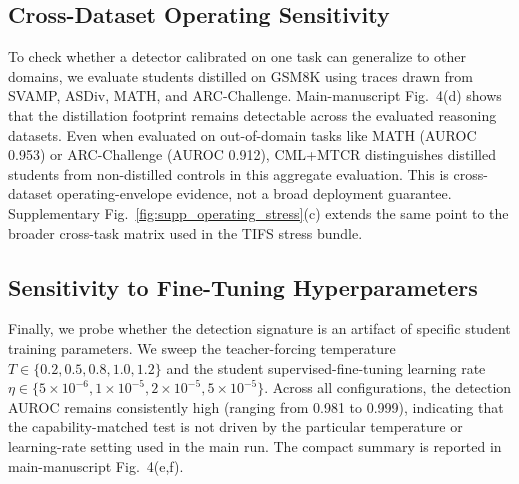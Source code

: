 \documentclass[onecolumn,journal]{IEEEtran}
\begin{document}
\subsection{Cross-Dataset Operating Sensitivity}
To check whether a detector calibrated on one task can generalize to other domains, we evaluate students distilled on GSM8K using traces drawn from SVAMP, ASDiv, MATH, and ARC-Challenge.
Main-manuscript Fig.~4(d) shows that the distillation footprint remains detectable
across the evaluated reasoning datasets. Even when evaluated on out-of-domain tasks
like MATH (AUROC 0.953) or ARC-Challenge (AUROC 0.912), CML+MTCR distinguishes
distilled students from non-distilled controls in this aggregate evaluation. This is
cross-dataset operating-envelope evidence, not a broad deployment guarantee.
Supplementary Fig.~\ref{fig:supp_operating_stress}(c) extends the same point to the
broader cross-task matrix used in the TIFS stress bundle.

\subsection{Sensitivity to Fine-Tuning Hyperparameters}
Finally, we probe whether the detection signature is an artifact of specific student training parameters. We sweep the teacher-forcing temperature $T \in \{0.2, 0.5, 0.8, 1.0, 1.2\}$ and the student supervised-fine-tuning learning rate $\eta \in \{5\times 10^{-6}, 1\times 10^{-5}, 2\times 10^{-5}, 5\times 10^{-5}\}$.
Across all configurations, the detection AUROC remains consistently high (ranging
from 0.981 to 0.999), indicating that the capability-matched test is not driven by
the particular temperature or learning-rate setting used in the main run.
The compact summary is reported in main-manuscript Fig.~4(e,f).
\end{document}
